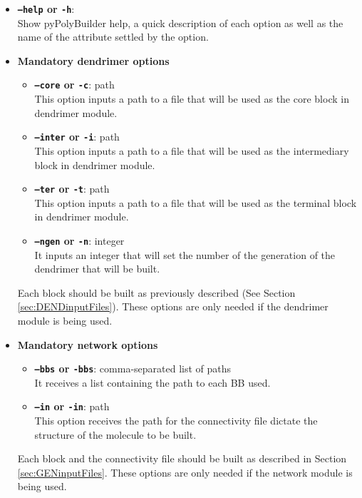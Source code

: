 \documentclass[12pt]{article}
\begin{document}
\begin{itemize}
  \item \textbf{\texttt{--help} or \texttt{-h}}:\\
    Show pyPolyBuilder help, a quick description of each option as well as the name of the attribute settled by the option.
    
  \item \textbf{Mandatory dendrimer options}
\begin{itemize}
  \item \textbf{\texttt{--core} or \texttt{-c}}: path\\
    This option inputs a path to a file that will be used as the core block in dendrimer module.
  \item \textbf{\texttt{--inter} or \texttt{-i}}: path\\
    This option inputs a path to a file that will be used as the intermediary block in dendrimer module.
  \item \textbf{\texttt{--ter} or \texttt{-t}}: path\\
    This option inputs a path to a file that will be used as the terminal block in dendrimer module.
  \item \textbf{\texttt{--ngen} or \texttt{-n}}: integer\\
    It inputs an integer that will set the number of the generation of the dendrimer that will be built.
\end{itemize}

    Each block should be built as previously described (See Section \ref{sec:DENDinputFiles}).
    These options are only needed if the dendrimer module is being used.
    
  \item \textbf{Mandatory network options}
\begin{itemize}
  \item \textbf{\texttt{--bbs} or \texttt{-bbs}}: comma-separated list of paths\\
    It receives a list containing the path to each BB used.
  \item \textbf{\texttt{--in} or \texttt{-in}}: path\\
    This option receives the path for the connectivity file dictate the structure of the molecule to be built.
 \end{itemize}   
    
    Each block and the connectivity file should be built as described in Section \ref{sec:GENinputFiles}.
    These options are only needed if the network module is being used.
    

\end{itemize}
\end{document}
